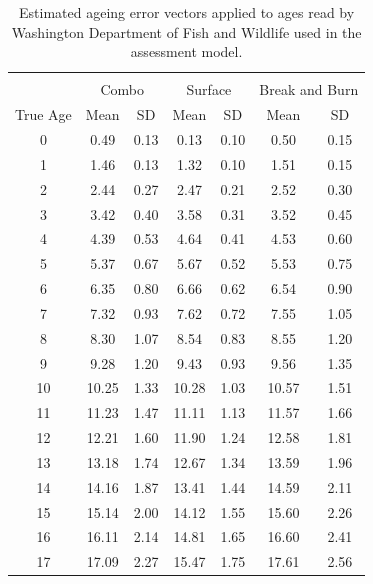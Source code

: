 \documentclass[12pt,]{article}
\begin{document}
\FloatBarrier

\begin{table}[ht]
\centering
\caption{Estimated ageing error vectors applied to ages read by Washington Department of Fish and Wildlife used in the assessment model.} 
\label{tab:age_error2}
\begin{tabular}{ccccccc}
  \hline
 &  &  &  &  &  &  \\ 
   & \multicolumn{2}{c}{Combo} &  \multicolumn{2}{c}{Surface} & \multicolumn{2}{c}{Break and Burn} \\
 True Age & Mean & SD & Mean &  SD  & Mean &  SD  \\
 \hline
0 & 0.49 & 0.13 & 0.13 & 0.10 & 0.50 & 0.15 \\ 
  1 & 1.46 & 0.13 & 1.32 & 0.10 & 1.51 & 0.15 \\ 
  2 & 2.44 & 0.27 & 2.47 & 0.21 & 2.52 & 0.30 \\ 
  3 & 3.42 & 0.40 & 3.58 & 0.31 & 3.52 & 0.45 \\ 
  4 & 4.39 & 0.53 & 4.64 & 0.41 & 4.53 & 0.60 \\ 
  5 & 5.37 & 0.67 & 5.67 & 0.52 & 5.53 & 0.75 \\ 
  6 & 6.35 & 0.80 & 6.66 & 0.62 & 6.54 & 0.90 \\ 
  7 & 7.32 & 0.93 & 7.62 & 0.72 & 7.55 & 1.05 \\ 
  8 & 8.30 & 1.07 & 8.54 & 0.83 & 8.55 & 1.20 \\ 
  9 & 9.28 & 1.20 & 9.43 & 0.93 & 9.56 & 1.35 \\ 
  10 & 10.25 & 1.33 & 10.28 & 1.03 & 10.57 & 1.51 \\ 
  11 & 11.23 & 1.47 & 11.11 & 1.13 & 11.57 & 1.66 \\ 
  12 & 12.21 & 1.60 & 11.90 & 1.24 & 12.58 & 1.81 \\ 
  13 & 13.18 & 1.74 & 12.67 & 1.34 & 13.59 & 1.96 \\ 
  14 & 14.16 & 1.87 & 13.41 & 1.44 & 14.59 & 2.11 \\ 
  15 & 15.14 & 2.00 & 14.12 & 1.55 & 15.60 & 2.26 \\ 
  16 & 16.11 & 2.14 & 14.81 & 1.65 & 16.60 & 2.41 \\ 
  17 & 17.09 & 2.27 & 15.47 & 1.75 & 17.61 & 2.56 \\ 
   \hline
\end{tabular}
\end{table}

\FloatBarrier
\end{document}
